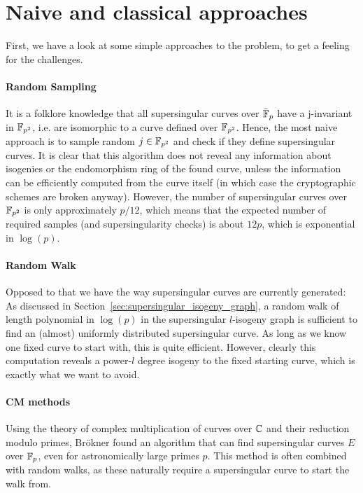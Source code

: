 \section{Naive and classical approaches}
\label{prop:naive_classical_approaches}
First, we have a look at some simple approaches to the problem, to get a feeling for the challenges.

\paragraph{Random Sampling} It is a folklore knowledge that all supersingular curves over $\bar{\mathbb{F}}_p$ have a j-invariant in $\mathbb{F}_{p^2}$, i.e. are isomorphic to a curve defined over $\mathbb{F}_{p^2}$.
Hence, the most naive approach is to sample random $j \in \mathbb{F}_{p^2}$ and check if they define supersingular curves.
It is clear that this algorithm does not reveal any information about isogenies or the endomorphism ring of the found curve, unless the information can be efficiently computed from the curve itself (in which case the cryptographic schemes are broken anyway).
However, the number of supersingular curves over $\mathbb{F}_{p^2}$ is only approximately $p/12$, which means that the expected number of required samples (and supersingularity checks) is about $12p$, which is exponential in $\log(p)$.

\paragraph{Random Walk} Opposed to that we have the way supersingular curves are currently generated:
As discussed in Section~\ref{sec:supersingular_isogeny_graph}, a random walk of length polynomial in $\log(p)$ in the supersingular $l$-isogeny graph is sufficient to find an (almost) uniformly distributed supersingular curve.
As long as we know one fixed curve to start with, this is quite efficient.
However, clearly this computation reveals a power-$l$ degree isogeny to the fixed starting curve, which is exactly what we want to avoid.

\paragraph{CM methods} Using the theory of complex multiplication of curves over $\mathbb{C}$ and their reduction modulo primes, Brökner \cite{constructing_supersingular_curves} found an algorithm that can find supersingular curves $E$ over $\mathbb{F}_p$, even for astronomically large primes $p$.
This method is often combined with random walks, as these naturally require a supersingular curve to start the walk from.

